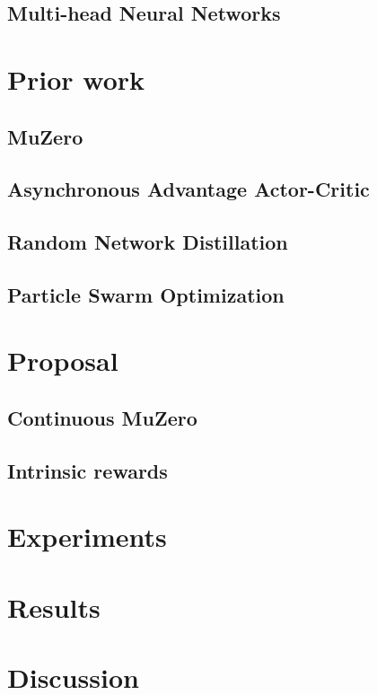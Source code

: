 \documentclass{article}
\begin{document}
\subsection{Multi-head Neural Networks}

\section{Prior work}
\subsection{MuZero}
\subsection{Asynchronous Advantage Actor-Critic}
\subsection{Random Network Distillation}
\subsection{Particle Swarm Optimization}

\section{Proposal}
\subsection{Continuous MuZero}
\subsection{Intrinsic rewards}

\section{Experiments}

\section{Results}

\section{Discussion}
\end{document}
